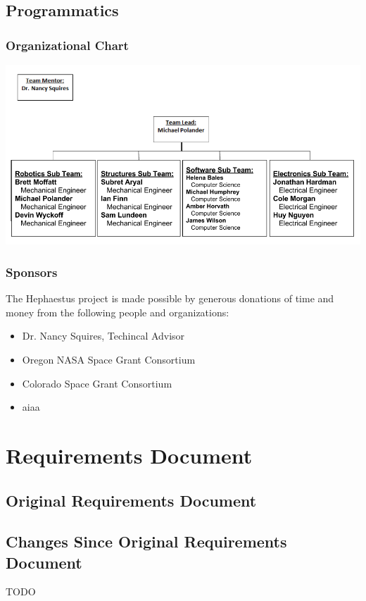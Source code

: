 \documentclass[letterpaper,10pt]{article}
\begin{document}
\subsection{Programmatics}
\subsubsection{Organizational Chart}
\includegraphics[width=\textwidth]{./images/orgChart.png}

\subsubsection{Sponsors}
The Hephaestus project is made possible by generous donations of time and money
from the following people and organizations:
\begin{itemize}
  \item{Dr. Nancy Squires, Techincal Advisor}
  \item{Oregon NASA Space Grant Consortium}
  \item{Colorado Space Grant Consortium}
  \item{\gls{aiaa}}
\end{itemize}

\section{Requirements Document}
\subsection{Original Requirements Document}


\subsection{Changes Since Original Requirements Document}
TODO

\end{document}
